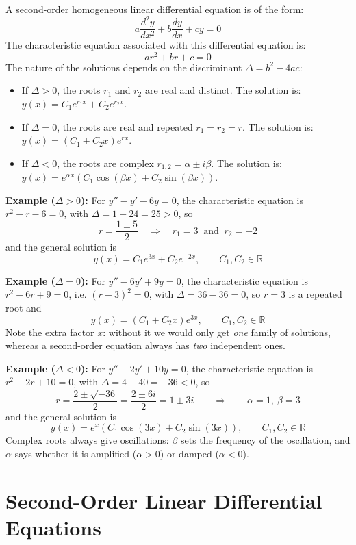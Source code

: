 \documentclass[]{article}
\newcommand{\R}{\mathbb{R}}
\begin{document}
	A second-order homogeneous linear differential equation is of the form:
	$$
	a\frac{d^2y}{dx^2} + b\frac{dy}{dx} + cy = 0
	$$
	The characteristic equation associated with this differential equation is:
	$$
	ar^2 + br + c = 0
	$$
	The nature of the solutions depends on the discriminant $\Delta = b^2 - 4ac$:
	\begin{itemize}
		\item If $\Delta > 0$, the roots $r_1$ and $r_2$ are real and distinct.
		The solution is: $y(x) = C_1e^{r_1x} + C_2e^{r_2x}$.
		\item If $\Delta = 0$, the roots are real and repeated $r_1 = r_2 = r$.
		The solution is: $y(x) = (C_1 + C_2x)e^{rx}$.
		\item If $\Delta < 0$, the roots are complex $r_{1,2} = \alpha \pm i\beta$.
		The solution is: $y(x) = e^{\alpha x}(C_1\cos(\beta x) + C_2\sin(\beta x))$.
	\end{itemize}

	\noindent \textbf{Example ($\Delta > 0$):}
	For $y'' - y' - 6y = 0$, the characteristic equation is $r^2 - r - 6 = 0$, with $\Delta = 1 + 24 = 25 > 0$, so
	$$
	r = \frac{1 \pm 5}{2} \quad \Longrightarrow \quad r_1 = 3 \ \text{ and } \ r_2 = -2
	$$
	and the general solution is
	$$
	y(x) = C_1 e^{3x} + C_2 e^{-2x}, \qquad C_1, C_2 \in \R
	$$

	\noindent \textbf{Example ($\Delta = 0$):}
	For $y'' - 6y' + 9y = 0$, the characteristic equation is $r^2 - 6r + 9 = 0$, i.e. $(r-3)^2 = 0$, with $\Delta = 36 - 36 = 0$, so $r = 3$ is a repeated root and
	$$
	y(x) = (C_1 + C_2 x) e^{3x}, \qquad C_1, C_2 \in \R
	$$
	Note the extra factor $x$: without it we would only get \textit{one} family of solutions, whereas a second-order equation always has \textit{two} independent ones.

	\noindent \textbf{Example ($\Delta < 0$):}
	For $y'' - 2y' + 10y = 0$, the characteristic equation is $r^2 - 2r + 10 = 0$, with $\Delta = 4 - 40 = -36 < 0$, so
	$$
	r = \frac{2 \pm \sqrt{-36}}{2} = \frac{2 \pm 6i}{2} = 1 \pm 3i
	\qquad \Longrightarrow \qquad \alpha = 1, \ \beta = 3
	$$
	and the general solution is
	$$
	y(x) = e^{x}\left(C_1 \cos(3x) + C_2 \sin(3x)\right), \qquad C_1, C_2 \in \R
	$$
	Complex roots always give oscillations: $\beta$ sets the frequency of the oscillation, and $\alpha$ says whether it is amplified ($\alpha > 0$) or damped ($\alpha < 0$).

	\section{Second-Order Linear Differential Equations}
	
\end{document}
